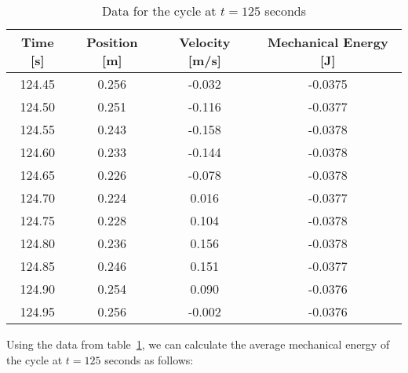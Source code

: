 \documentclass[titlepage]{article}
\begin{document}
            \begin{table}[H]
                \small
                \centering
                \begin{tabular}{|c|c|c|c|}
                    \hline
                    Time [s] & Position [m] & Velocity [m/s] & Mechanical Energy [J] \\
                    \hline
                    124.45   & 0.256        & -0.032         & -0.0375               \\
                    \hline
                    124.50   & 0.251        & -0.116         & -0.0377               \\
                    \hline
                    124.55   & 0.243        & -0.158         & -0.0378               \\
                    \hline
                    124.60   & 0.233        & -0.144         & -0.0378               \\
                    \hline
                    124.65   & 0.226        & -0.078         & -0.0378               \\
                    \hline
                    124.70   & 0.224        & 0.016          & -0.0377               \\
                    \hline
                    124.75   & 0.228        & 0.104          & -0.0378               \\
                    \hline
                    124.80   & 0.236        & 0.156          & -0.0378               \\
                    \hline
                    124.85   & 0.246        & 0.151          & -0.0377               \\
                    \hline
                    124.90   & 0.254        & 0.090          & -0.0376               \\
                    \hline
                    124.95   & 0.256        & -0.002         & -0.0376               \\
                    \hline
                \end{tabular}
                \caption{Data for the cycle at $t=125$ seconds}\label{tab:cycle-at-125-seconds-mechanical-energy-table}
            \end{table}
            Using the data from table~\ref{tab:cycle-at-125-seconds-mechanical-energy-table}, we can calculate the average mechanical energy of the cycle at $t=125$ seconds as follows:
            
\end{document}
